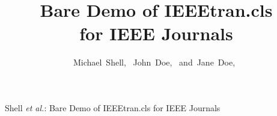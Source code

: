 \documentclass[journal]{IEEEtran}
\begin{document}
%
\title{Bare Demo of IEEEtran.cls\\ for IEEE Journals}
%
%
%

\author{Michael~Shell,~
        John~Doe,~
        and~Jane~Doe,~%
}

% 
%



%
{Shell \MakeLowercase{\textit{et al.}}: Bare Demo of IEEEtran.cls for IEEE Journals}
% 
\end{document}
